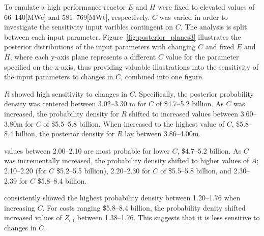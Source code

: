 \documentclass[journal]{IEEEtran}
\begin{document}




To emulate a high performance reactor $E$ and $H$ were fixed to elevated values of 66--140[MWe] and 581--769[MWt], respectively. $C$ was varied in order to investigate the sensitivity input varibles contingent on $C$. The analysis is split between each input parameter. Figure~\ref{fig:posterior_planes3} illustrates the posterior distributions of the input parameters with changing $C$ and fixed $E$ and $H$, where each y-axis plane represents a different $C$ value for the parameter specified on the x-axis, thus providing valuable illustrations into the sensitivity of the input parameters to changes in $C$, combined into one figure. 

\textbf{$R$} showed high sensitivity to changes in $C$. Specifically, the posterior probability density was centered between 3.02--3.30 m for $C$ of \$4.7--5.2 billion. As $C$ was increased, the probability density for $R$ shifted to increased values between 3.60--3.80m for $C$ of \$5.5--5.8 billion. When increased to the highest value of $C$, \$5.8--8.4 billion, the posterior density for $R$ lay between 3.86--4.00m. 

 values between 2.00--2.10 are most probable for lower $C$, \$4.7--5.2 billion. As $C$ was incrementally increased, the probability density shifted to higher values of $A$; 2.10--2.20 (for $C$ \$5.2--5.5 billion), 2.20--2.30 for $C$ of \$5.5--5.8 billion, and 2.30--2.39 for $C$ \$5.8--8.4 billion.  

 consistently showed the highest probability density between 1.20--1.76 when increasing $C$. For costs ranging \$5.8--8.4 billion, the probability denity shifted increased values of $Z_{\text{eff}}$ between 1.38--1.76. This suggests that it is less sensitive to changes in $C$.
\end{document}
